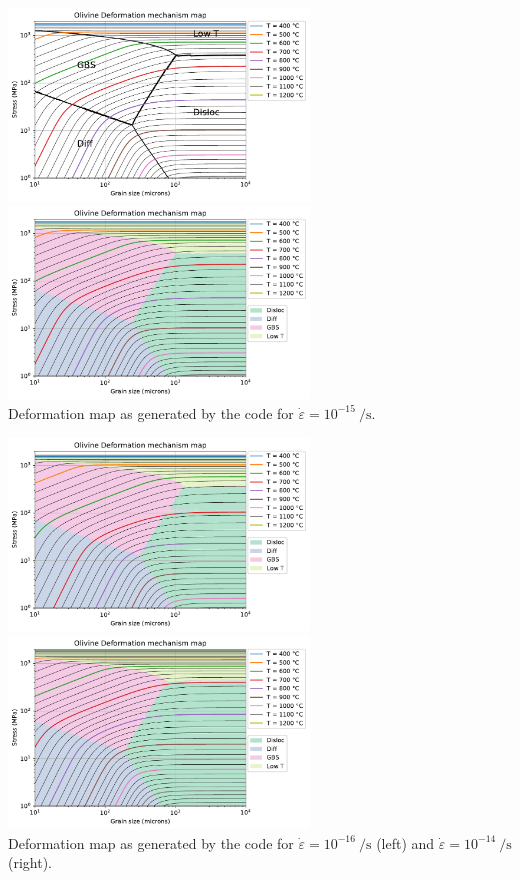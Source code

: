 \begin{center}
\includegraphics[width=8cm]{python_codes/fieldstone_121/results/deformation_map_boundaries_1e-15.pdf}
\includegraphics[width=8cm]{python_codes/fieldstone_121/results/deformation_map_filledareas_1e-15.pdf}\\
{\captionfont Deformation map as generated by the code for $\dot\varepsilon=10^{-15}~\si{\per\second}$.}
\end{center}

\begin{center}
\includegraphics[width=8cm]{python_codes/fieldstone_121/results/deformation_map_filledareas_1e-16.pdf}
\includegraphics[width=8cm]{python_codes/fieldstone_121/results/deformation_map_filledareas_1e-14.pdf}\\
{\captionfont Deformation map as generated by the code for $\dot\varepsilon=10^{-16}~\si{\per\second}$ (left)
and $\dot\varepsilon=10^{-14}~\si{\per\second}$ (right).}
\end{center}


